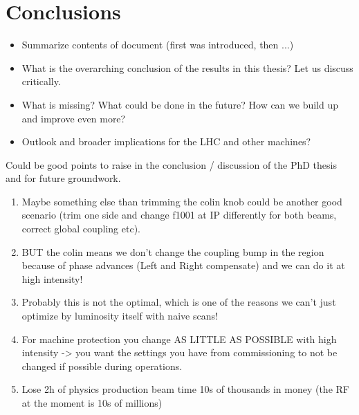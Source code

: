 \chapter{Conclusions}
\label{chapter:conclusion}


\begin{itemize}
    \item Summarize contents of document (first was introduced, then ...)
    \item What is the overarching conclusion of the results in this thesis? Let us discuss critically.
    \item What is missing? What could be done in the future? How can we build up and improve even more?
    \item Outlook and broader implications for the LHC and other machines?
\end{itemize}


Could be good points to raise in the conclusion / discussion of the PhD thesis and for future groundwork.

\begin{enumerate}
    \item Maybe something else than trimming the colin knob could be another good scenario (trim one side and change f1001 at IP differently for both beams, correct global coupling etc).
    \item BUT the colin means we don't change the coupling bump in the region because of phase advances (Left and Right compensate) and we can do it at high intensity!
    \item Probably this is not the optimal, which is one of the reasons we can't just optimize by luminosity itself with naive scans!
    \item For machine protection you change AS LITTLE AS POSSIBLE with high intensity -> you want the settings you have from commissioning to not be changed if possible during operations.
    \item Lose 2h of physics production beam time 10s of thousands in money (the RF at the moment is 10s of millions)
\end{enumerate}


